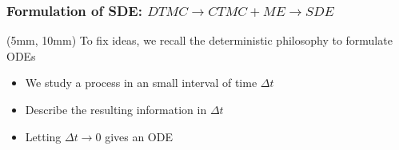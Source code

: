 \begin{frame}
    \frametitle{Formulation of SDE: $DTMC \to CTMC + ME \to SDE$}
    \begin{textblock*}{50mm}(5mm, 10mm)
        To fix ideas, we recall the
        deterministic philosophy to
        formulate ODEs
        \begin{itemize}
            \item<2-> 
                We study a process in an small interval of
                time $\Delta t$
            \item<3->
                Describe the resulting information in $\Delta t$
            \item<4->
                Letting $\Delta t \to 0$ gives an ODE
        \end{itemize}
    \end{textblock*}
%
%
%
 \end{frame}
